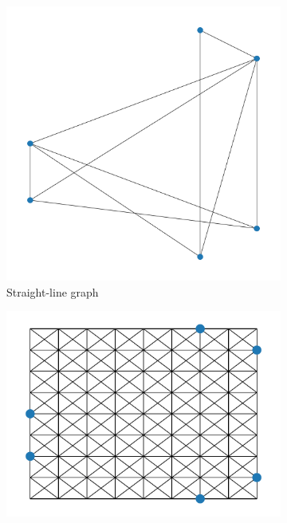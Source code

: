 \newpage

\begin{figure}[H]
    \begin{subfigure}{0.32\linewidth}
        \centering
        \includegraphics[width=\linewidth]{figures/algo_progress/original_default_graph.pdf}
        \caption{Straight-line graph}
        \label{fig:def_0}
    \end{subfigure}
    \begin{subfigure}{0.32\linewidth}
        \centering
        \includegraphics[width=\linewidth]{figures/algo_progress/default_graph_1-0.pdf}

\end{subfigure}
\end{figure}
